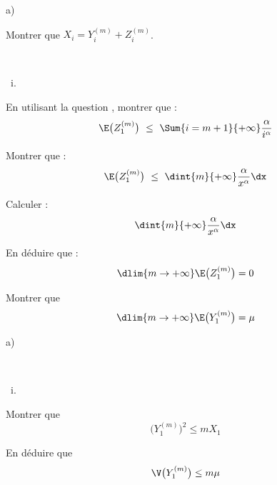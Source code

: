 \documentclass[11pt]{article}%
\begin{document}
\begin{liste}{a)}
  \setlength{\itemsep}{2mm}
\item Montrer que $X_{i} = Y_{i}^{(m)} + Z_{i}^{(m)}$.
  
  

\item ~\\[-1.15cm]
\end{liste}
\begin{liste}{\ i.}
\item En utilisant la question , montrer que :
  \[
  \E\big(Z_{1}^{(m)} \big) \ \leq \ \Sum{i = m + 1}{+ \infty}
  \dfrac{\alpha}{i^{\alpha}}
  \]
  
  




\item Montrer que :
  \[
  \E\big(Z_{1}^{(m)} \big) \ \leq \ \dint{m}{+ \infty}
  \dfrac{\alpha}{x^{\alpha}} \dx
  \]

  
  
\item Calculer :
  \[
  \dint{m}{+ \infty} \dfrac{\alpha}{x^{\alpha}} \dx
  \]

  

\item En déduire que :
  \[
  \dlim{m \to + \infty} \E\big(Z_{1}^{(m)} \big) = 0
  \]

  
  
\item Montrer que
  \[
  \dlim{m \to + \infty} \E\big(Y_{1}^{(m)} \big) = \mu
  \]

  
\end{liste}




\begin{liste}{a)}
  \setcounter{enumi}{2}
\item ~\\[-1.15cm]
\end{liste}
\begin{liste}{\ i.}
\item Montrer que
  \[
  \big( Y_{1}^{(m)} \big)^{2} \leq m X_{1}
  \]
  
  
  
\item En déduire que
  \[
  \V\big(Y_{1}^{(m)} \big) \leq m \mu
  \]
  
  
\end{liste}
\end{document}
